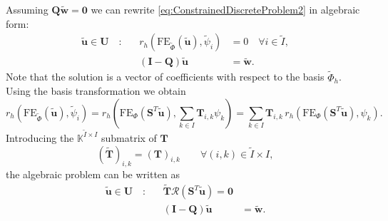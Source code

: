 Assuming $\mathbf{Q}\tilde{\mathbf{w}}=\mathbf{0}$ we can rewrite
\eqref{eq:ConstrainedDiscreteProblem2} in algebraic form:
\begin{subequations}
\begin{align*}
\tilde{\mathbf{u}}\in\mathbf{U} \quad : &&
r_h(\text{FE}_{\tilde\Phi}(\tilde{\mathbf{u}}),\tilde\psi_i) &= 0 \quad \forall i \in
\tilde{I}, \\
&& (\mathbf{I}-\mathbf{Q})\tilde{\mathbf{u}} &= \tilde{\mathbf{w}} .
\end{align*}
\end{subequations}
Note that the solution is a vector of coefficients with respect to the
basis $\tilde\Phi_h$. Using the basis transformation we obtain
\begin{equation*}
r_h(\text{FE}_{\tilde\Phi}(\tilde{\mathbf{u}}),\tilde\psi_i) = 
r_h\left(\text{FE}_{\Phi}(\mathbf{S}^T\tilde{\mathbf{u}}),\sum_{k\in
  I}\mathbf{T}_{i,k}\psi_k\right)
= \sum_{k\in I} \mathbf{T}_{i,k}
\, r_h\left(\text{FE}_{\Phi}(\mathbf{S}^T\tilde{\mathbf{u}}),\psi_k\right) .
\end{equation*}
Introducing the $\mathbb{K}^{\tilde{I}\times I}$ submatrix of
$\mathbf{T}$
\begin{equation*}
\left(\tilde{\mathbf{T}}\right)_{i,k} = \left(\mathbf{T}\right)_{i,k}
\qquad \forall (i,k) \in \tilde{I}\times I ,
\end{equation*}
the algebraic problem can be written as
\begin{subequations}
\begin{align}\label{eq:ConstrainedDiscreteProblem3}
\tilde{\mathbf{u}}\in\mathbf{U} \quad : &&
\tilde{\mathbf{T}} \mathcal{R}(\mathbf{S}^T\tilde{\mathbf{u}}) = \mathbf{0} \\
&& (\mathbf{I}-\mathbf{Q})\tilde{\mathbf{u}} &= \tilde{\mathbf{w}} .
\end{align}
\end{subequations}

